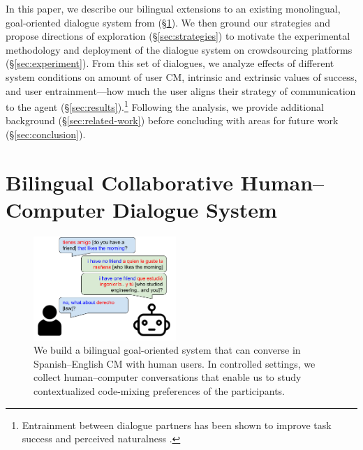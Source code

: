 \documentclass[11pt,a4paper]{article}
\newcommand{\yt}[1]{\textcolor{cyan}{\bf\small [#1 --YT]}}
\newcommand{\Sref}[1]{\S\ref{#1}}
\begin{document}
In this paper, we describe our bilingual extensions to an existing monolingual, goal-oriented dialogue system from \citet{He2017} (\Sref{sec:dialogue-system}).
We then ground our strategies and propose directions of exploration (\Sref{sec:strategies}) to motivate the experimental methodology and deployment of the dialogue system on crowdsourcing platforms (\Sref{sec:experiment}). 
From this set of dialogues, we analyze effects of different system conditions on amount of user CM, intrinsic and extrinsic values of success, and user entrainment---how much the user aligns their strategy of communication to the agent (\Sref{sec:results}).\footnote{Entrainment between dialogue partners has been shown to improve task success and perceived naturalness \citep{reitter2014alignment,Nenkova2008}.}
Following the analysis, we provide additional background (\Sref{sec:related-work}) before concluding with areas for future work (\Sref{sec:conclusion}).


\section{Bilingual Collaborative Human--Computer Dialogue System}
\label{sec:dialogue-system}

\begin{figure}
	\includegraphics[width=0.48\textwidth]{img/ex_chat_1101}
	\centering
  	\caption{We build a bilingual goal-oriented system that can converse in Spanish--English CM with human users. In controlled settings, we collect human--computer conversations that enable us to study contextualized code-mixing preferences of the participants.}
    \label{fig:human-comp-chat}
\end{figure}
\end{document}

